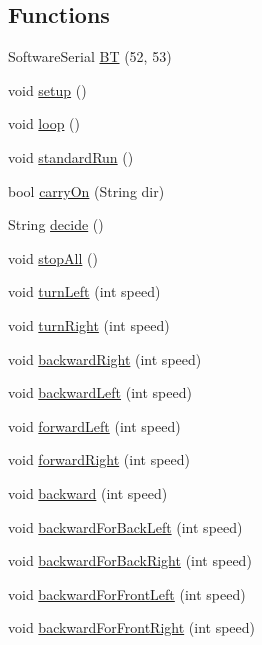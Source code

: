 \subsection*{Functions}
\begin{DoxyCompactItemize}
\item 
Software\+Serial \hyperlink{car_8ino_a2cca1c020108fcb2373c68a07273a43b}{BT} (52, 53)
\item 
void \hyperlink{car_8ino_a4fc01d736fe50cf5b977f755b675f11d}{setup} ()
\item 
void \hyperlink{car_8ino_afe461d27b9c48d5921c00d521181f12f}{loop} ()
\item 
void \hyperlink{car_8ino_af597af78b8192bd4439e8d1d570e95a1}{standard\+Run} ()
\item 
bool \hyperlink{car_8ino_ad46b410153632e6620adf44c21873de5}{carry\+On} (String dir)
\item 
String \hyperlink{car_8ino_ab056fd4ab103d47f70a5ab4a469d1c08}{decide} ()
\item 
void \hyperlink{car_8ino_a4823aa91e33925c0da5969f5011c07da}{stop\+All} ()
\item 
void \hyperlink{car_8ino_adcc2352cf3d5cf7317b119265c8deb03}{turn\+Left} (int speed)
\item 
void \hyperlink{car_8ino_af9cc2a3cfa7536ca9039202968bc40b5}{turn\+Right} (int speed)
\item 
void \hyperlink{car_8ino_a4a2b1571265ea8470805dfb28713bc0f}{backward\+Right} (int speed)
\item 
void \hyperlink{car_8ino_a3b887a1e60a824c3e9e9c7e41f0245cf}{backward\+Left} (int speed)
\item 
void \hyperlink{car_8ino_a6bea6c9230620fc358ac2fe3cdc495ee}{forward\+Left} (int speed)
\item 
void \hyperlink{car_8ino_aff9a5f1aef152d83f0f6aec7ff3a9c79}{forward\+Right} (int speed)
\item 
void \hyperlink{car_8ino_a2915381729924a9acc25236cadf9391d}{backward} (int speed)
\item 
void \hyperlink{car_8ino_aefcffdc351fa6a2c75de903b76d7cde5}{backward\+For\+Back\+Left} (int speed)
\item 
void \hyperlink{car_8ino_a132295235efc0d707c2e34134af320d4}{backward\+For\+Back\+Right} (int speed)
\item 
void \hyperlink{car_8ino_af1ff7cc133f26792314dc587d391a2e9}{backward\+For\+Front\+Left} (int speed)
\item 
void \hyperlink{car_8ino_a9303a11d73ff753cab62587a431ad893}{backward\+For\+Front\+Right} (int speed)

\end{DoxyCompactItemize}
